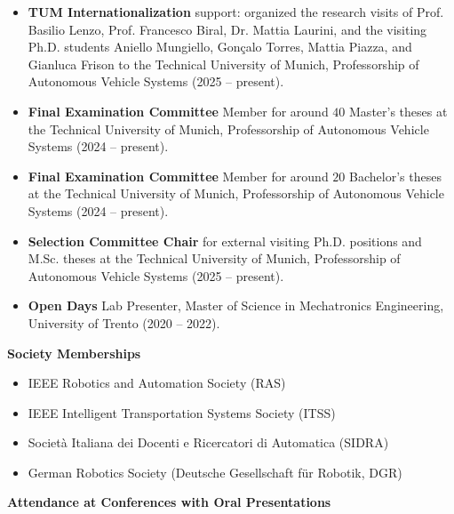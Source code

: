 \begin{itemize}
    \item \textbf{TUM Internationalization} support: organized the research visits of Prof. Basilio Lenzo, Prof. Francesco Biral, Dr. Mattia Laurini, and the visiting Ph.D. students Aniello Mungiello, Gonçalo Torres, Mattia Piazza, and Gianluca Frison to the Technical University of Munich, Professorship of Autonomous Vehicle Systems (2025 -- present).
    \item \textbf{Final Examination Committee} Member for around $40$ Master's theses at the Technical University of Munich, Professorship of Autonomous Vehicle Systems (2024 -- present).
    \item \textbf{Final Examination Committee} Member for around $20$ Bachelor's theses at the Technical University of Munich, Professorship of Autonomous Vehicle Systems (2024 -- present).
    \item \textbf{Selection Committee Chair} for external visiting Ph.D. positions and M.Sc. theses at the Technical University of Munich, Professorship of Autonomous Vehicle Systems (2025 -- present).
    \item \textbf{Open Days} Lab Presenter, Master of Science in Mechatronics Engineering, University of Trento (2020 -- 2022).
\end{itemize}

\vspace{0.2cm}
{\large\bfseries\sffamily Society Memberships}

\begin{itemize}
    \item IEEE Robotics and Automation Society (RAS)
    \item IEEE Intelligent Transportation Systems Society (ITSS)
    \item Società Italiana dei Docenti e Ricercatori di Automatica (SIDRA)
    \item German Robotics Society (Deutsche Gesellschaft für Robotik, DGR)
\end{itemize}

\vspace{0.2cm}
{\large\bfseries\sffamily Attendance at Conferences with Oral Presentations}

